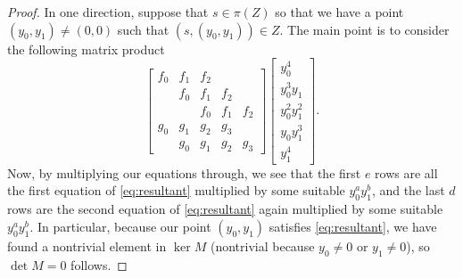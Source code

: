 \documentclass[../notes.tex]{subfiles}
\begin{document}
\begin{proof}
	In one direction, suppose that $s\in\pi(Z)$ so that we have a point $(y_0,y_1)\ne(0,0)$ such that $(s,(y_0,y_1))\in Z$. The main point is to consider the following matrix product
	\[\begin{bmatrix}
		f_0 & f_1 & f_2 \\
		    & f_0 & f_1 & f_2 \\
			&     & f_0 & f_1 & f_2 \\
		g_0 & g_1 & g_2 & g_3 \\
		    & g_0 & g_1 & g_2 & g_3
	\end{bmatrix}\begin{bmatrix}
		y_0^4 \\
		y_0^3y_1 \\
		y_0^2y_1^2 \\
		y_0y_1^3 \\
		y_1^4
	\end{bmatrix}.\]
	Now, by multiplying our equations through, we see that the first $e$ rows are all the first equation of \autoref{eq:resultant} multiplied by some suitable $y_0^ay_1^b$, and the last $d$ rows are the second equation of \autoref{eq:resultant} again multiplied by some suitable $y_0^ay_1^b$. In particular, because our point $(y_0,y_1)$ satisfies \autoref{eq:resultant}, we have found a nontrivial element in $\ker M$ (nontrivial because $y_0\ne0$ or $y_1\ne0$), so $\det M=0$ follows.


\end{proof}
\end{document}
